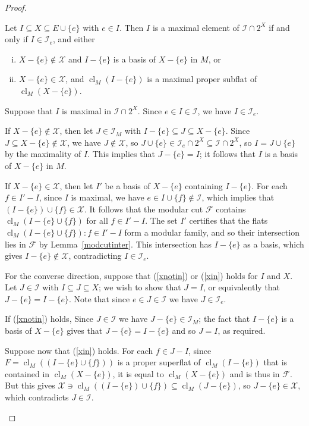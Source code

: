 \documentclass[10pt,a4paper]{amsart}
\newcommand{\cF}{\mathcal{F}}
\newcommand{\cI}{\mathcal{I}}
\newcommand{\cX}{\mathcal{X}}
\DeclareMathOperator{\cl}{cl}
\renewcommand{\ss}{\subseteq}
\begin{document}
\begin{proof}
  \begin{claim}\label{foo2}
    Let $I \ss X \ss E \cup \{e\}$ with $e \in I$. Then $I$ is a maximal element of 
    $\cI \cap 2^X$ if and only if $I \in \cI_e$, and either 
    \begin{enumerate}[(i)]
      \item\label{xnotin} $X - \{e\} \notin \cX$ and $I - \{e\}$ is a basis of $X - \{e\}$ in $M$, or
      \item\label{xin} $X - \{e\} \in \cX$, and $\cl_M(I-\{e\})$ is a maximal proper subflat of $\cl_M(X - \{e\})$. 
    \end{enumerate}
  \end{claim}
  \begin{subproof}
    Suppose that $I$ is maximal in $\cI \cap 2^X$. Since $e \in I \in \cI$, 
    we have $I \in \cI_e$. 
    
    If $X - \{e\} \notin \cX$, then let $J \in \cI_M$ with
    $I - \{e\} \ss J \ss X - \{e\}$. Since $J \ss X - \{e\} \notin \cX$, 
    we have $J \notin \cX$, so $J \cup \{e\} \in \cI_e \cap 2^X \ss \cI \cap 2^X$, 
    so $I = J \cup \{e\}$ by the maximality of $I$. This implies that $J - \{e\} = I$; 
    it follows that $I$ is a basis of $X - \{e\}$ in $M$. 

    If $X - \{e\} \in \cX$, then let $I'$ be a basis of $X - \{e\}$ containing $I - \{e\}$. 
    For each $f \in I' - I$, since $I$ is maximal, we have $e \in I \cup \{f\} \notin \cI$, 
    which implies that $(I - \{e\}) \cup \{f\} \in \cX$. It follows that the modular cut 
    $\cF$ contains $\cl_M(I - \{e\} \cup \{f\})$ for all $f \in I' - I$. The set $I'$ 
    certifies that the flats $\cl_M(I - \{e\} \cup \{f\}) : f \in I' - I$ form a modular 
    family, and so their intersection lies in $\cF$ by Lemma~\ref{modcutinter}.
    This intersection has $I - \{e\}$ as a basis, which gives $I - \{e\} \notin \cX$, contradicting $I \in \cI_e$. 

    For the converse direction, suppose that (\ref{xnotin}) or (\ref{xin}) holds for $I$ and $X$. Let $J \in \cI$ with $I \ss J \ss X$; we wish to show that $J = I$, or equivalently 
    that $J - \{e\} = I - \{e\}$. Note that since $e \in J \in \cI$ we have $J \in \cI_e$. 
    
    If (\ref{xnotin}) holds, 
    Since $J \in \cI$ we have $J - \{e\} \in \cI_M$; 
    the fact that $I - \{e\}$ is a basis of $X - \{e\}$ gives that $J - \{e\} = I - \{e\}$ 
    and so $J = I$, as required. 

    Suppose now that (\ref{xin}) holds. For each $f \in J - I$, 
    since $F = \cl_M((I - \{e\} \cup \{f\}))$ is a proper superflat of $\cl_M(I - \{e\})$ 
    that is contained in $\cl_M(X - \{e\})$, it is equal to $\cl_M(X - \{e\})$ 
    and is thus in $\cF$. But this gives 
    $\cX \ni \cl_M((I - \{e\}) \cup \{f\}) \ss \cl_M(J - \{e\})$, 
    so $J - \{e\} \in \cX$, which contradicts $J \in \cI$. 
  \end{subproof}


\end{proof}
\end{document}
